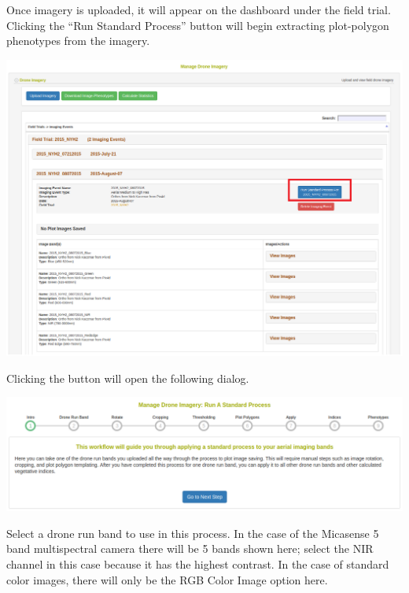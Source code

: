 \documentclass[
  12pt,
]{book}
\begin{document}
Once imagery is uploaded, it will appear on the dashboard under the field trial. Clicking the ``Run Standard Process'' button will begin extracting plot-polygon phenotypes from the imagery.

\begin{center}\includegraphics[width=0.95\linewidth]{assets/images/manage_image_phenotyping_standard_process_button} \end{center}

Clicking the button will open the following dialog.

\begin{center}\includegraphics[width=0.95\linewidth]{assets/images/manage_image_phenotyping_standard_process_intro} \end{center}

Select a drone run band to use in this process. In the case of the Micasense 5 band multispectral camera there will be 5 bands shown here; select the NIR channel in this case because it has the highest contrast. In the case of standard color images, there will only be the RGB Color Image option here.
\end{document}
